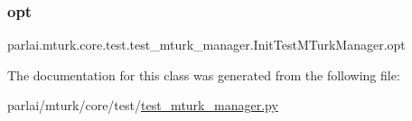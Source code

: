 \subsubsection{\texorpdfstring{opt}{opt}}
{\footnotesize\ttfamily parlai.\+mturk.\+core.\+test.\+test\+\_\+mturk\+\_\+manager.\+Init\+Test\+M\+Turk\+Manager.\+opt}



The documentation for this class was generated from the following file\+:\begin{DoxyCompactItemize}
\item 
parlai/mturk/core/test/\hyperlink{test_2test__mturk__manager_8py}{test\+\_\+mturk\+\_\+manager.\+py}\end{DoxyCompactItemize}
